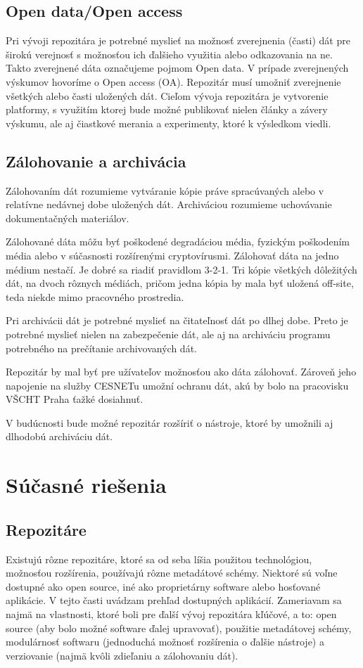 \documentclass[thesis=M,slovak]{FITthesis}[2013/05/06]
\begin{document}
\section{Open data/Open access}
Pri vývoji repozitára je potrebné myslieť na možnosť zverejnenia (časti) dát pre širokú verejnosť s možnosťou ich ďalšieho využitia alebo odkazovania na ne. Takto zverejnené dáta označujeme pojmom Open data. V prípade zverejnených výskumov hovoríme o Open access (OA). Repozitár musí umožniť zverejnenie všetkých alebo časti uložených dát. Cieľom vývoja repozitára je vytvorenie platformy, s využitím ktorej bude možné publikovať nielen články a závery výskumu, ale aj čiastkové merania a experimenty, ktoré k výsledkom viedli.

\section{Zálohovanie a archivácia}
Zálohovaním dát rozumieme vytváranie kópie práve spracúvaných alebo v relatívne nedávnej dobe uložených dát. Archiváciou rozumieme uchovávanie dokumentačných materiálov.

Zálohované dáta môžu byť poškodené degradáciou média, fyzickým poškodením média alebo v súčasnosti rozšírenými cryptovírusmi. Zálohovať dáta na jedno médium nestačí. Je dobré sa riadiť pravidlom 3-2-1. Tri kópie všetkých dôležitých dát, na dvoch rôznych médiách, pričom jedna kópia by mala byť uložená off-site, teda niekde mimo pracovného prostredia. \cite{zalohovanie}

Pri archivácii dát je potrebné myslieť na čitateľnosť dát po dlhej dobe. Preto je potrebné myslieť nielen na zabezpečenie dát, ale aj na archiváciu programu potrebného na prečítanie archivovaných dát.

Repozitár by mal byť pre užívateľov možnosťou ako dáta zálohovať. Zároveň jeho napojenie na služby CESNETu umožní ochranu dát, akú by bolo na pracovisku VŠCHT Praha ťažké dosiahnuť.

V budúcnosti bude možné repozitár rozšíriť o nástroje, ktoré by umožnili aj dlhodobú archiváciu dát.

\chapter{Súčasné riešenia}
\section{Repozitáre}
Existujú rôzne repozitáre, ktoré sa od seba líšia použitou technológiou, možnosťou rozšírenia, používajú rôzne metadátové schémy. Niektoré sú voľne dostupné ako open source, iné ako proprietárny software alebo hosťované aplikácie. V tejto časti uvádzam prehľad dostupných aplikácií. Zameriavam sa najmä na vlastnosti, ktoré boli pre ďalší vývoj repozitára kľúčové, a to: open source (aby bolo možné software ďalej upravovať), použitie metadátovej schémy, modulárnosť softwaru (jednoduchá možnosť rozšírenia o ďalšie nástroje) a verziovanie (najmä kvôli zdieľaniu a zálohovaniu dát).
\end{document}
